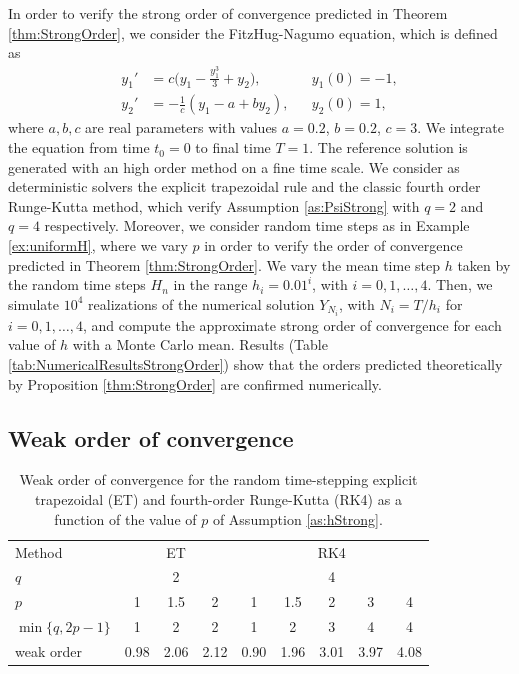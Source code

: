 \documentclass{siamart1116}
\numberwithin{theorem}{section}
\begin{document}
In order to verify the strong order of convergence predicted in Theorem \ref{thm:StrongOrder}, we consider the FitzHug-Nagumo equation, which is defined as
\begin{equation}\label{eq:FitzNag}
\begin{aligned}
y_1' &= c\big(y_1 - \frac{y_1^3}{3} + y_2\big), && y_1(0) = -1, \\
y_2' &= -\frac{1}{c}(y_1 - a + by_2), && y_2(0) = 1,
\end{aligned}
\end{equation}
where $a, b, c$ are real parameters with values $a = 0.2$, $b = 0.2$, $c = 3$. We integrate the equation from time $t_0 = 0$ to final time $T = 1$. The reference solution is generated with an high order method on a fine time scale. We consider as deterministic solvers the explicit trapezoidal rule and the classic fourth order Runge-Kutta method, which verify Assumption \ref{as:PsiStrong} with $q = 2$ and $q = 4$ respectively. Moreover, we consider random time steps as in Example \ref{ex:uniformH}, where we vary $p$ in order to verify the order of convergence predicted in Theorem \ref{thm:StrongOrder}. We vary the mean time step $h$ taken by the random time steps $H_n$ in the range $h_i = 0.01^{i}$, with $i = 0, 1, \ldots, 4$. Then, we simulate $10^4$ realizations of the numerical solution $Y_{N_i}$, with $N_i = T / h_i$ for $i = 0, 1, \ldots, 4$, and compute the approximate strong order of convergence for each value of $h$ with a Monte Carlo mean. Results (Table \ref{tab:NumericalResultsStrongOrder}) show that the orders predicted theoretically by Proposition \ref{thm:StrongOrder} are confirmed numerically. 

\subsection{Weak order of convergence}

\begin{table}[t]
	\centering
	\begin{tabular}{lcccccccc}
		\toprule
		Method & \multicolumn{3}{c}{ET} & \multicolumn{5}{c}{RK4} \\ 
		\cmidrule(l{2pt}r{2pt}){2-4} \cmidrule(l{2pt}r{2pt}){5-9} 
		$q$ & \multicolumn{3}{c}{2} & \multicolumn{5}{c}{4} \\
		$p$ & 1 & 1.5 & 2 & 1 & 1.5 & 2 & 3 & 4\\
		$\min\{q, 2p - 1\}$ & 1 & 2 & 2 & 1 & 2 & 3 & 4 & 4 \\
		weak order & 0.98 & 2.06 & 2.12 & 0.90 & 1.96 & 3.01 & 3.97 & 4.08 \\
		\bottomrule
	\end{tabular}
	\caption{Weak order of convergence for the random time-stepping explicit trapezoidal (ET) and fourth-order Runge-Kutta (RK4) as a function of the value of $p$ of Assumption \ref{as:hStrong}.}
	\label{tab:NumericalResultsWeakOrder}
\end{table}
\end{document}
